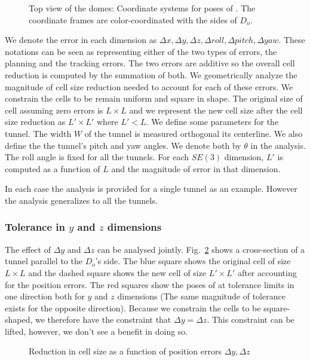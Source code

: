 \documentclass[a4paper]{report}
\begin{document}
\begin{figure}[ht]
\centering
\caption{Top view of the domes: Coordinate systems for poses of \calS. The coordinate frames are color-coordinated with the sides of $D_o$.}
\label{fig:shield_frames}
\end{figure}

We denote the error in each dimension as $\Delta x,\Delta y, \Delta z,\Delta roll,\Delta pitch,\Delta yaw$. These notations can be seen as representing either of the two types of errors, the planning and the tracking errors. The two errors are additive so the overall cell reduction is computed by the summation of both.
%
We geometrically analyze the magnitude of cell size reduction needed to account for each of these errors. We constrain the cells to be remain uniform and square in shape. The original size of cell assuming zero errors is $L \times L$ and we represent the new cell size after the cell size reduction as $L' \times L'$ where $L' < L$.
%
We define some parameters for the tunnel. The width $W$ of the tunnel is measured orthogonal its centerline. We also define the the tunnel's pitch and yaw angles. We denote both by $\theta$ in the analysis. The roll angle is fixed for all the tunnels.
%
For each $SE(3)$ dimension, $L'$ is computed as a function of $L$ and the magnitude of error in that dimension.

In each case the analysis is provided for a single tunnel as an example. However the analysis generalizes to all the tunnels.
%

\subsubsection{Tolerance in $y$ and $z$ dimensions}
The effect of $\Delta y$ and $\Delta z$ can be analysed jointly. Fig.~\ref{fig:shield_yz} shows a cross-section of a tunnel parallel to the $D_o$'s side. The blue square shows the original cell of size $L \times L$ and the dashed square shows the new cell of size $L' \times L'$ after accounting for the position errors. The red squares show the poses of \calS at tolerance limits in one direction both for $y$ and $z$ dimensions (The same magnitude of tolerance exists for the opposite direction). Because we constrain the cells to be square-shaped, we therefore have the constraint that $\Delta y = \Delta z$. This constraint can be lifted, however, we don't see a benefit in doing so.

\begin{figure}[ht]
\centering
\caption{Reduction in cell size as a function of position errors $\Delta y, \Delta z$}
\label{fig:shield_yz}
\end{figure}
\end{document}
